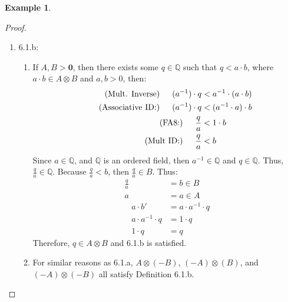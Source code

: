 \documentclass[openany, amssymb, psamsfonts]{amsart}
\newcommand{\bbQ}{\mathbb{Q}}
\newcommand{\bbR}{\mathbb{R}}
\theoremstyle{definition}
\newtheorem{exmp}{Example}[section]
\numberwithin{equation}{section}
\begin{document}
\begin{exmp}
\begin{enumerate}[(a)]
\begin{proof}
\begin{enumerate}
\begin{enumerate}
        \item If $A > i(0)$ and $B<i(0)$, then because $-B$ exists by Theorem \ref{7.35}, and Example \ref{7.36} states that $\textbf{0}<-B$, then since $A,-B > \textbf{0}$, then by a.ii.A, $A \otimes (-B) \neq \bbQ$. 
        \item If $A < i(0)$ and $B>i(0)$, then because $-A$ exists by Theorem \ref{7.35}, and Example \ref{7.36} states that $\textbf{0}<-A$, then since $-A,B > \textbf{0}$, then by a.ii.A, $(-A) \otimes (B) \neq \bbQ$.
        \item If $A < i(0)$ and $B<i(0)$, then by similar logic as above, both $-A\in \bbR$ exists and $\textbf{0}<-A$ and $\textbf{0}<-B$. Thus, since $-A,-B > \textbf{0}$, then by a.ii.A, $(-A)\otimes (-B) \neq \bbQ$
    \end{enumerate}
    Thus, $A\otimes B$, $A \otimes (-B)$, $(-A) \otimes (B)$, and $(-A)\otimes (-B)$ all satisfy Definition 6.1.a
\item 6.1.b:
\begin{enumerate}
    \item If $A,B > \textbf{0}$, then there exists some $q\in \bbQ$ such that $q<a\cdot b$, where $a\cdot b\in A\otimes B$ and $a,b>0$, then:
    \begin{align*}
        \tag{Mult. Inverse}\indent (a^{-1})\cdot q&<a^{-1}\cdot(a\cdot b)\\
        \tag{Associative ID:}\indent (a^{-1})\cdot q&<(a^{-1}\cdot a)\cdot b\\
        \tag{FA8:}\indent \frac{q}{a}&<1 \cdot b\\
        \tag{Mult ID:}\indent \frac{q}{a}&< b
    \end{align*}
    Since $a\in \bbQ$, and $\bbQ$ is an ordered field, then $a^{-1}\in \bbQ$ and $q\in \bbQ$. Thus, $\frac{q}{a}\in \bbQ$. Because $\frac{q}{a}<b$, then $\frac{q}{a}\in B$. Thus:
    \begin{align*}
        \frac{q}{a} &= b \in B\\
        a &= a\in A\\
        \tag{Mult Inverse}\;\;\; a\cdot b' &= a\cdot a^{-1}\cdot q\\
        \tag{FA8:}\;\;\; a\cdot a^{-1}\cdot q&= 1\cdot q\\
        \tag{Additive ID:}\;\;\; 1\cdot q &= q
    \end{align*}
    Therefore, $q\in A\otimes B$ and 6.1.b is satisfied. 
    \item For similar reasons as 6.1.a, $A \otimes (-B)$, $(-A) \otimes (B)$, and $(-A)\otimes (-B)$ all satisfy Definition 6.1.b.

\end{enumerate}
\end{enumerate}
\end{proof}
\end{enumerate}
\end{exmp}
\end{document}
